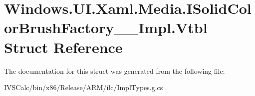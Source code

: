 \hypertarget{struct_windows_1_1_u_i_1_1_xaml_1_1_media_1_1_i_solid_color_brush_factory_____impl_1_1_vtbl}{}\section{Windows.\+U\+I.\+Xaml.\+Media.\+I\+Solid\+Color\+Brush\+Factory\+\_\+\+\_\+\+Impl.\+Vtbl Struct Reference}
\label{struct_windows_1_1_u_i_1_1_xaml_1_1_media_1_1_i_solid_color_brush_factory_____impl_1_1_vtbl}


The documentation for this struct was generated from the following file\+:\begin{DoxyCompactItemize}
\item 
I\+V\+S\+Calc/bin/x86/\+Release/\+A\+R\+M/ilc/Impl\+Types.\+g.\+cs\end{DoxyCompactItemize}
